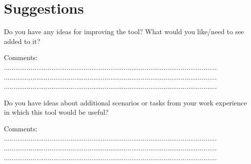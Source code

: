 \documentclass[a4paper]{exam}
\begin{document}
\section{Suggestions}


Do you have any ideas for improving the tool? What would you like/need to see added to it?\newline

Comments: \newline
................................................................................................................ \newline
................................................................................................................ \newline
................................................................................................................ \newline

\noindent Do you have ideas about additional scenarios or tasks from your work experience in which this tool would be useful? \newline

Comments: \newline
................................................................................................................ \newline
................................................................................................................ \newline
................................................................................................................ \newline 
\end{document}
